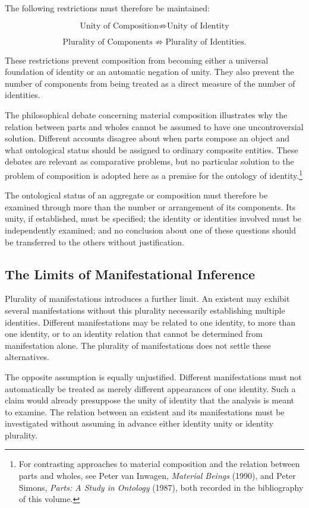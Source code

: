 The following restrictions must therefore be
maintained:

\[
\text{Unity of Composition}
\not\Rightarrow
\text{Unity of Identity}
\]

\[
\text{Plurality of Components}
\not\Rightarrow
\text{Plurality of Identities}.
\]

These restrictions prevent composition from becoming
either a universal foundation of identity or an
automatic negation of unity. They also prevent
the number of components from being treated as
a direct measure of the number of identities.

The philosophical debate concerning material
composition illustrates why the relation between
parts and wholes cannot be assumed to have one
uncontroversial solution. Different accounts
disagree about when parts compose an object and
what ontological status should be assigned to
ordinary composite entities. These debates are
relevant as comparative problems, but no particular
solution to the problem of composition is adopted
here as a premise for the ontology of identity.\footnote{For contrasting approaches to material composition and the relation between parts and wholes, see Peter van Inwagen, \textit{Material Beings} (1990), and Peter Simons, \textit{Parts: A Study in Ontology} (1987), both recorded in the bibliography of this volume.}

The ontological status of an aggregate or composition
must therefore be examined through more than the
number or arrangement of its components. Its unity,
if established, must be specified; the identity
or identities involved must be independently
examined; and no conclusion about one of these
questions should be transferred to the others
without justification.

\subsection{The Limits of Manifestational Inference}

Plurality of manifestations introduces a further
limit. An existent may exhibit several manifestations
without this plurality necessarily establishing
multiple identities. Different manifestations may
be related to one identity, to more than one identity,
or to an identity relation that cannot be determined
from manifestation alone. The plurality of
manifestations does not settle these alternatives.

The opposite assumption is equally unjustified.
Different manifestations must not automatically
be treated as merely different appearances of one
identity. Such a claim would already presuppose
the unity of identity that the analysis is meant
to examine. The relation between an existent and
its manifestations must be investigated without
assuming in advance either identity unity or
identity plurality.

